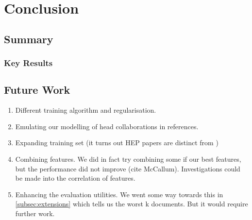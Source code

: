 
\chapter{Conclusion} %

\label{Chapter6} %



\section{Summary}

\subsection{Key Results}

\section{Future Work}
\label{sec:futurework}
\begin{enumerate}
\item Different training algorithm and regularisation.
\item Emulating our modelling of head collaborations in references.
\item Expanding training set (it turns out HEP papers are distinct from )
\item Combining features. We did in fact try combining some if our best features, but the performance did not improve (cite McCallum). Investigations could be made into the correlation of features.
\item Enhancing the evaluation utilities. We went some way towards this in \ref{subsec:extensions} which tells us the worst k documents. But it would require further work.
\end{enumerate}
